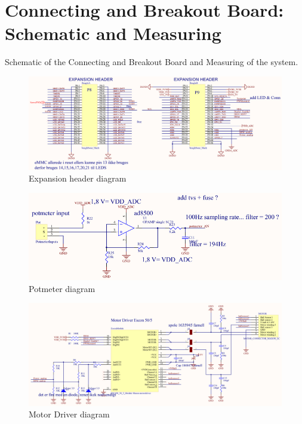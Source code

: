 \chapter{Connecting and Breakout Board: Schematic and Measuring}\label{app:ConnectingBreakoutBoard} 

Schematic of the Connecting and Breakout Board and Measuring of the system.

\begin{figure}[H]
  \centering
	\includegraphics[scale=0.92]{figures/ExpanionHeader.pdf}
	\caption{Expansion header diagram}
	\label{labExpanionHeader}
\end{figure}\vspace{-5mm}


\begin{figure}[H]
	\centering
	\includegraphics[scale=0.92]{figures/Potmeter.pdf}
	\caption{Potmeter diagram}
	\label{labPotmeter}
\end{figure}\vspace{-5mm}


\begin{figure}[H]
	\centering
	\includegraphics[scale=0.92]{figures/MotorDriver.pdf}
	\caption{Motor Driver diagram}
	\label{labMotorDriver}
\end{figure}\vspace{-5mm}


